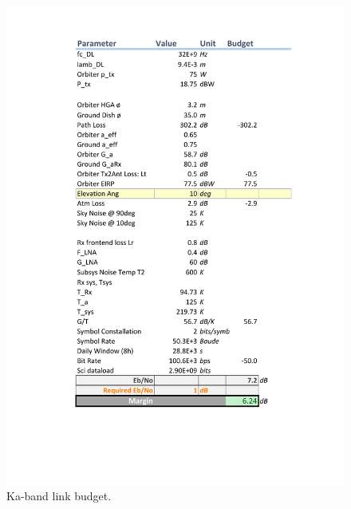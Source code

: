 \begin{figure}[H]
	\centering
	\includegraphics[width=\textwidth]{figures/comms/linkBudget-Kband}
	\caption{Ka-band link budget.}
	\label{fig:budget-K}
\end{figure}
